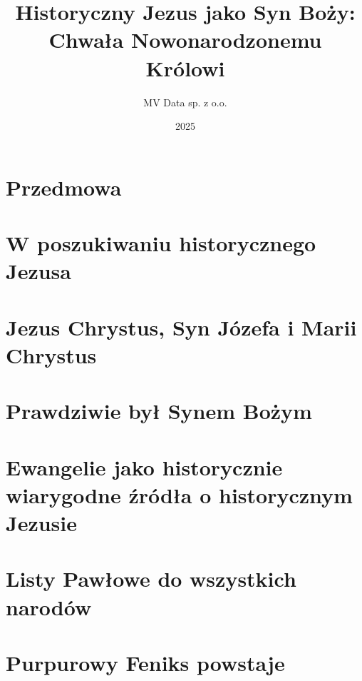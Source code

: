\documentclass[12pt]{book}
\title{Historyczny Jezus jako Syn Boży: Chwała Nowonarodzonemu Królowi}
\author{MV Data sp. z o.o.}
\date{2025}
\begin{document}
\maketitle

\tableofcontents

\chapter*{Przedmowa}


\chapter{W poszukiwaniu historycznego Jezusa}\label{ch:the-quest-for-the-historical-jesus}


\chapter{Jezus Chrystus, Syn Józefa i Marii Chrystus}\label{ch:jesus-christ-son-of-joseph-and-mary-christ}


\chapter{Prawdziwie był Synem Bożym}\label{ch:he-truly-was-the-son-of-god}


\chapter{Ewangelie jako historycznie wiarygodne źródła o historycznym Jezusie}\label{ch:gospels-are-historically-reliable}


\chapter{Listy Pawłowe do wszystkich narodów}\label{ch:pauline-epistles-to-all-nations}


\chapter{Purpurowy Feniks powstaje}\label{ch:the-purple-phoenix-raises}




\backmatter
\nocite{*}
\printbibliography[keyword=ancient,title={Starożytne źródła pierwotne}]
\printbibliography[keyword=patristic,title={Ojcowie Kościoła i wczesna literatura chrześcijańska}]
\printbibliography[keyword=modern,title={Opracowania współczesne}]
\end{document}

